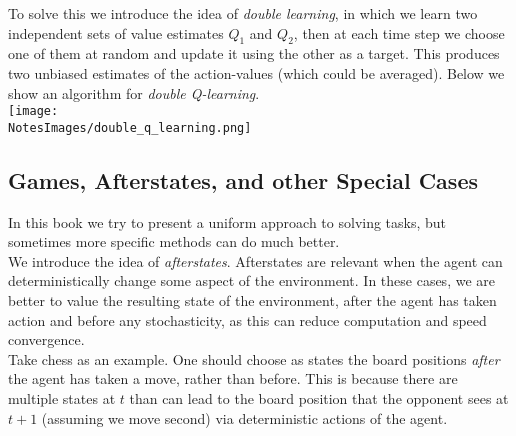 To solve this we introduce the idea of \emph{double learning}, in which we learn two independent sets of value estimates $Q_1$ and $Q_2$, then at each time step we choose one of them at random and update it using the other as a target. This produces two unbiased estimates of the action-values (which could be averaged). Below we show an algorithm for \emph{double Q-learning}. \\

\texttt{[image: \\NotesImages/double\_q\_learning.png]} \\ 


\subsection{Games,  Afterstates, and other Special Cases}
In this book we try to present a uniform approach to solving tasks, but sometimes more specific methods can do much better. \\

We introduce the idea of \emph{afterstates}. Afterstates are relevant when the agent can deterministically change some aspect of the environment. In these cases, we are better to value the resulting state of the environment, after the agent has taken action and before any stochasticity, as this can reduce computation and speed convergence.\\

Take chess as an example. One should choose as states the board positions \emph{after} the agent has taken a move, rather than before. This is because there are multiple states at $t$ than can lead to the board position that the opponent sees at $t+1$ (assuming we move second) via deterministic actions of the agent. 
